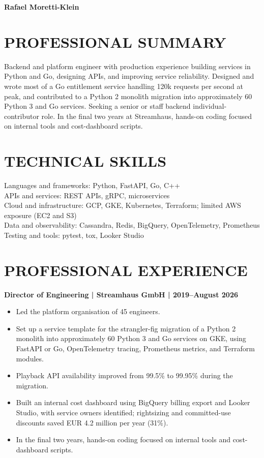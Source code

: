 \documentclass[11pt,a4paper]{article}
\begin{document}
\begin{center}
{\Huge\bfseries\color{primarycolor} Rafael Moretti-Klein}
\end{center}
\vspace{-0.5em}

\section*{PROFESSIONAL SUMMARY}
Backend and platform engineer with production experience building services in Python and Go, designing APIs, and improving service reliability. Designed and wrote most of a Go entitlement service handling 120k requests per second at peak, and contributed to a Python 2 monolith migration into approximately 60 Python 3 and Go services. Seeking a senior or staff backend individual-contributor role. In the final two years at Streamhaus, hands-on coding focused on internal tools and cost-dashboard scripts.

\section*{TECHNICAL SKILLS}
Languages and frameworks: Python, FastAPI, Go, C++\\
APIs and services: REST APIs, gRPC, microservices\\
Cloud and infrastructure: GCP, GKE, Kubernetes, Terraform; limited AWS exposure (EC2 and S3)\\
Data and observability: Cassandra, Redis, BigQuery, OpenTelemetry, Prometheus\\
Testing and tools: pytest, tox, Looker Studio

\section*{PROFESSIONAL EXPERIENCE}
\noindent\textbf{Director of Engineering | Streamhaus GmbH | 2019--August 2026}
\begin{itemize}
\item Led the platform organisation of 45 engineers.
\item Set up a service template for the strangler-fig migration of a Python 2 monolith into approximately 60 Python 3 and Go services on GKE, using FastAPI or Go, OpenTelemetry tracing, Prometheus metrics, and Terraform modules.
\item Playback API availability improved from 99.5\% to 99.95\% during the migration.
\item Built an internal cost dashboard using BigQuery billing export and Looker Studio, with service owners identified; rightsizing and committed-use discounts saved EUR 4.2 million per year (31\%).
\item In the final two years, hands-on coding focused on internal tools and cost-dashboard scripts.
\end{itemize}
\end{document}
